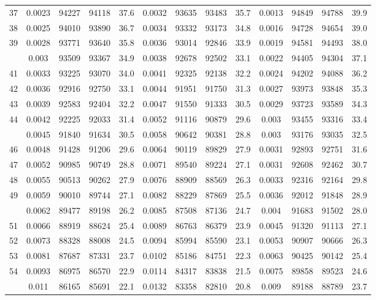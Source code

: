 \documentclass[
  14pt,
]{article}
\begin{document}
\begin{longtable}[t]{lcccccccccccc}
37 & 0.0023 & 94227 & 94118 & 37.6 & 0.0032 & 93635 & 93483 & 35.7 & 0.0013 & 94849 & 94788 & 39.9\\
38 & 0.0025 & 94010 & 93890 & 36.7 & 0.0034 & 93332 & 93173 & 34.8 & 0.0016 & 94728 & 94654 & 39.0\\
39 & 0.0028 & 93771 & 93640 & 35.8 & 0.0036 & 93014 & 92846 & 33.9 & 0.0019 & 94581 & 94493 & 38.0\\
\addlinespace
40 & 0.003 & 93509 & 93367 & 34.9 & 0.0038 & 92678 & 92502 & 33.1 & 0.0022 & 94405 & 94304 & 37.1\\
41 & 0.0033 & 93225 & 93070 & 34.0 & 0.0041 & 92325 & 92138 & 32.2 & 0.0024 & 94202 & 94088 & 36.2\\
42 & 0.0036 & 92916 & 92750 & 33.1 & 0.0044 & 91951 & 91750 & 31.3 & 0.0027 & 93973 & 93848 & 35.3\\
43 & 0.0039 & 92583 & 92404 & 32.2 & 0.0047 & 91550 & 91333 & 30.5 & 0.0029 & 93723 & 93589 & 34.3\\
44 & 0.0042 & 92225 & 92033 & 31.4 & 0.0052 & 91116 & 90879 & 29.6 & 0.003 & 93455 & 93316 & 33.4\\
\addlinespace
45 & 0.0045 & 91840 & 91634 & 30.5 & 0.0058 & 90642 & 90381 & 28.8 & 0.003 & 93176 & 93035 & 32.5\\
46 & 0.0048 & 91428 & 91206 & 29.6 & 0.0064 & 90119 & 89829 & 27.9 & 0.0031 & 92893 & 92751 & 31.6\\
47 & 0.0052 & 90985 & 90749 & 28.8 & 0.0071 & 89540 & 89224 & 27.1 & 0.0031 & 92608 & 92462 & 30.7\\
48 & 0.0055 & 90513 & 90262 & 27.9 & 0.0076 & 88909 & 88569 & 26.3 & 0.0033 & 92316 & 92164 & 29.8\\
49 & 0.0059 & 90010 & 89744 & 27.1 & 0.0082 & 88229 & 87869 & 25.5 & 0.0036 & 92012 & 91848 & 28.9\\
\addlinespace
50 & 0.0062 & 89477 & 89198 & 26.2 & 0.0085 & 87508 & 87136 & 24.7 & 0.004 & 91683 & 91502 & 28.0\\
51 & 0.0066 & 88919 & 88624 & 25.4 & 0.0089 & 86763 & 86379 & 23.9 & 0.0045 & 91320 & 91113 & 27.1\\
52 & 0.0073 & 88328 & 88008 & 24.5 & 0.0094 & 85994 & 85590 & 23.1 & 0.0053 & 90907 & 90666 & 26.3\\
53 & 0.0081 & 87687 & 87331 & 23.7 & 0.0102 & 85186 & 84751 & 22.3 & 0.0063 & 90425 & 90142 & 25.4\\
54 & 0.0093 & 86975 & 86570 & 22.9 & 0.0114 & 84317 & 83838 & 21.5 & 0.0075 & 89858 & 89523 & 24.6\\
\addlinespace
55 & 0.011 & 86165 & 85691 & 22.1 & 0.0132 & 83358 & 82810 & 20.8 & 0.009 & 89188 & 88789 & 23.7\\

\end{longtable}
\end{document}
